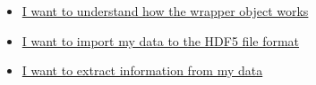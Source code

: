 \begin{tcolorbox}[title=What are you looking for?]
    \begin{itemize}
        \item \hyperref[chapter:wrapper]{I want to understand how the wrapper object works}
        \item \hyperref[sec:load_data]{I want to import my data to the HDF5 file format}
        \item \hyperref[sec:treatment]{I want to extract information from my data }
    \end{itemize}
\end{tcolorbox}